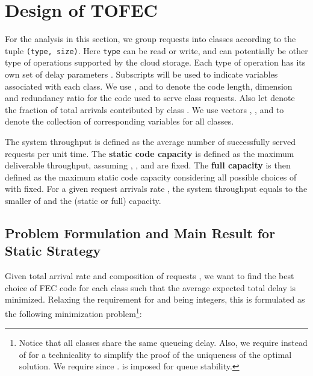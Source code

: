 \documentclass[journal]{IEEEtran}
\newcommand{\comment}[1]{}
\newcommand{\ourproposal}{TOFEC\xspace}
\begin{document}
\comment{
We assume there are  classes of requests. Requests of each class have identical file size  and all are divided into chunks of identical size. Under this assumption, service times of all chunks of the same class follow the same distribution and each class  can be characterized by a three-tuple , where  and  specifies the delay distribution of class- chunks.
Throughout this paper, we assume 's (and accordingly chunk sizes) are determined a priori and  are given. Our focus will be on the adaptation/choice of 's.  
}







\section{Design of \ourproposal}
\label{sec:proposed-algorithm}

For the analysis in this section, we group requests into classes according to the tuple {\tt (type, size)}. Here {\tt type} can be read or write, and can potentially be other type of operations supported by the cloud storage. Each type of operation has its own set of delay parameters . Subscripts will be used to indicate variables associated with each class. We use ,  and  to denote the code length, dimension and redundancy ratio for the code used to serve class  requests. Also let  denote the fraction of total arrivals contributed by class . We use vectors , ,  and  to denote the collection of corresponding variables for all classes. 

The system throughput is defined as the average number of successfully served requests per unit time. The {\bf static code capacity}   is defined as the maximum deliverable throughput, assuming , , and  are fixed. The {\bf full capacity}  is then defined as the maximum static code capacity considering all possible choices of  with  fixed. For a given request arrivals rate , the system throughput equals to the smaller of  and the (static or full) capacity.


\subsection{Problem Formulation and Main Result for Static Strategy}
\label{ssec:ana:formulation}
Given total arrival rate  and composition of requests , we want to find the best choice of FEC code for each class such that the average expected total delay is minimized. Relaxing the requirement for  and  being integers, this is formulated as the following minimization problem\footnote{Notice that all classes share the same queueing delay. Also, we require  instead of  for a technicality to simplify the proof of the uniqueness of the optimal solution. We require  since .  is imposed for queue stability.}:
\end{document}
